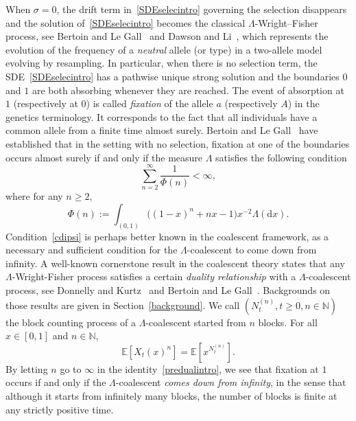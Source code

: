 \documentclass[10pt]{amsart}
\theoremstyle{definition}\newtheorem{defi}[theo]{Definition}\newtheorem{rema}[theo]{Remark}\newtheorem{exam}[theo]{Example}\newtheorem{exem}[theo]{Example}\newtheorem{nota}[theo]{Notation}
\newcommand{\ddr}{\mathrm{d}}
\newcommand{\bbN}{\mathbb{N}}
\newcommand{\bbE}{\mathbb{E}}
\begin{document}
When $\sigma=0$, the drift term in~\eqref{SDEselecintro} governing the selection disappears and the solution of~\eqref{SDEselecintro} becomes the classical $\Lambda$-Wright--Fisher process, see Bertoin and Le Gall~\cite{LGB2} and Dawson and Li~\cite{DawsonLi}, which represents the evolution of the frequency of a \emph{neutral} allele (or type) in a two-allele model evolving by resampling. In particular, when there is no selection term, the SDE~\eqref{SDEselecintro} has a pathwise unique strong solution and the boundaries $0$ and $1$ are both absorbing whenever they are reached. The event of absorption at $1$ (respectively at $0$) is called \emph{fixation} of the allele $a$ (respectively $A$) in the genetics terminology. It corresponds to the fact that all individuals have a common allele from a finite time almost surely. Bertoin and Le Gall~\cite{LGB2} have established that in the setting with no selection, fixation at one of the boundaries occurs almost surely if and only if the measure $\Lambda$ satisfies the following condition
\begin{equation}\label{cdipsi}
\sum_{n=2}^{\infty}\frac{1}{\Phi(n)}<\infty,
\end{equation}
where for any $n\geq 2$,
\begin{equation}\label{phi2}
\Phi(n):=\int_{(0,1)}\big((1-x)^{n}+nx-1\big)x^{-2}\Lambda(\ddr x).
\end{equation}
Condition~\eqref{cdipsi} is perhaps better known in the coalescent framework, as a necessary and sufficient condition for the $\Lambda$-coalescent to come down from infinity. A well-known cornerstone result in the coalescent theory states that any $\Lambda$-Wright-Fisher process satisfies a certain \emph{duality relationship} with a $\Lambda$-coalescent process, see Donnelly and Kurtz~\cite{DonnKurtz} and Bertoin and Le Gall~\cite{MR1990057}. Backgrounds on those results are given in Section~\ref{background}. We call $(N^{(n)}_t,t\geq 0,n\in \bbN)$ the block counting process of a $\Lambda$-coalescent started from $n$ blocks. For all $x\in [0,1]$ and $n\in \bbN$,
\begin{equation}\label{predualintro}
\bbE\left[X_t(x)^n\right]=\bbE\left[x^{N_t^{(n)}}\right].
\end{equation}
By letting $n$ go to $\infty$ in the identity~\eqref{predualintro}, we see that fixation at $1$ occurs if and only if the $\Lambda$-coalescent \emph{comes down from infinity}, in the sense that although it starts from infinitely many blocks, the number of blocks is finite at any strictly positive time.
\end{document}
